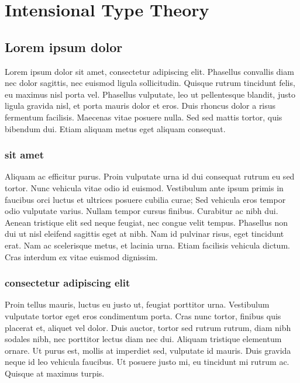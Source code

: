 \setchapterpreamble[u]{\margintoc}
\chapter{Intensional Type Theory}

\section{Lorem ipsum dolor}

 Lorem ipsum dolor sit amet, consectetur adipiscing elit. Phasellus convallis diam nec dolor sagittis, nec euismod ligula sollicitudin. Quisque rutrum tincidunt felis, eu maximus nisl porta vel. Phasellus vulputate, leo ut pellentesque blandit, justo ligula gravida nisl, et porta mauris dolor et eros. Duis rhoncus dolor a risus fermentum facilisis. Maecenas vitae posuere nulla. Sed sed mattis tortor, quis bibendum dui. Etiam aliquam metus eget aliquam consequat.

\subsection{sit amet}

Aliquam ac efficitur purus. Proin vulputate urna id dui consequat rutrum eu sed tortor. Nunc vehicula vitae odio id euismod. Vestibulum ante ipsum primis in faucibus orci luctus et ultrices posuere cubilia curae; Sed vehicula eros tempor odio vulputate varius. Nullam tempor cursus finibus. Curabitur ac nibh dui. Aenean tristique elit sed neque feugiat, nec congue velit tempus. Phasellus non dui ut nisl eleifend sagittis eget at nibh. Nam id pulvinar risus, eget tincidunt erat. Nam ac scelerisque metus, et lacinia urna. Etiam facilisis vehicula dictum. Cras interdum ex vitae euismod dignissim.

\subsection{consectetur adipiscing elit}

Proin tellus mauris, luctus eu justo ut, feugiat porttitor urna. Vestibulum vulputate tortor eget eros condimentum porta. Cras nunc tortor, finibus quis placerat et, aliquet vel dolor. Duis auctor, tortor sed rutrum rutrum, diam nibh sodales nibh, nec porttitor lectus diam nec dui. Aliquam tristique elementum ornare. Ut purus est, mollis at imperdiet sed, vulputate id mauris. Duis gravida neque id leo vehicula faucibus. Ut posuere justo mi, eu tincidunt mi rutrum ac. Quisque at maximus turpis.
